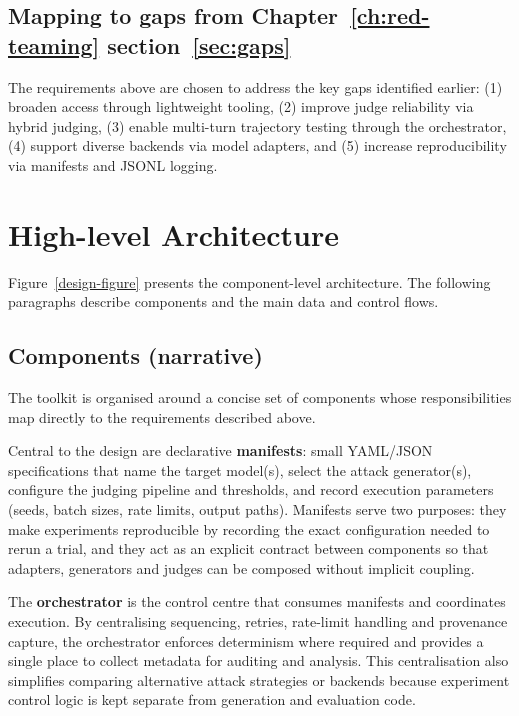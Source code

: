 \subsection{Mapping to gaps from Chapter~\ref{ch:red-teaming} section~\ref{sec:gaps}}\label{subsec:gap-mapping}

The requirements above are chosen to address the key gaps identified earlier:
(1) broaden access through lightweight tooling,
(2) improve judge reliability via hybrid judging,
(3) enable multi-turn trajectory testing through the orchestrator,
(4) support diverse backends via model adapters, and
(5) increase reproducibility via manifests and JSONL logging.

\section{High-level Architecture}\label{sec:architecture}

Figure~\ref{design-figure} presents the component-level architecture.
The following paragraphs describe components and the main data and control flows.

\subsection{Components (narrative)}\label{subsec:components}

The toolkit is organised around a concise set of components whose responsibilities map directly to the requirements described above.

Central to the design are declarative \textbf{manifests}: small YAML/JSON specifications that name the target model(s), select the attack generator(s), configure the judging pipeline and thresholds, and record execution parameters (seeds, batch sizes, rate limits, output paths).
Manifests serve two purposes: they make experiments reproducible by recording the exact configuration needed to rerun a trial, and they act as an explicit contract between components so that adapters, generators and judges can be composed without implicit coupling.

The \textbf{orchestrator} is the control centre that consumes manifests and coordinates execution. By centralising sequencing, retries, rate-limit handling and provenance capture, the orchestrator enforces determinism where required and provides a single place to collect metadata for auditing and analysis.
This centralisation also simplifies comparing alternative attack strategies or backends because experiment control logic is kept separate from generation and evaluation code.


